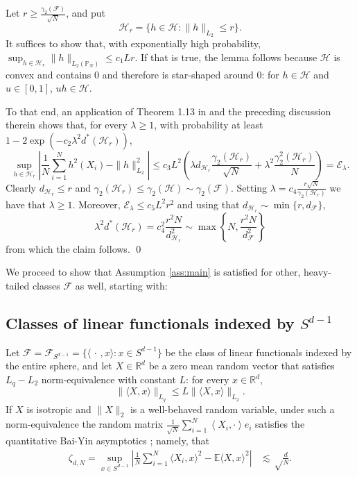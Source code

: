 \documentclass[11pt]{amsart}
\newcommand{\R}{\mathbb{R}}
\newcommand{\inr}[1]{\left\langle #1 \right\rangle}
\theoremstyle{definition}
\newcommand{\E}{\mathbb{E}}
\renewcommand{\P}{\mathbb{P}}
\numberwithin{equation}{section}
\begin{document}
	Let $r\geq   \frac{ \gamma_2(\mathcal{F}) }{ \sqrt N}$, and put 
	\[\mathcal{H}_r = \{ h\in \mathcal{H} : \|h\|_{L_{2}}\leq r\}.\]	
	It suffices to show that, with exponentially high probability, $\sup_{h\in\mathcal{H}_r} \|h\|_{L_2(\P_N)} \leq c_1L r$.
	If that is true, the lemma follows because $\mathcal{H}$ is convex and contains 0 and therefore is star-shaped around 0: for $h\in\mathcal{H}$ and $u\in[0,1]$, $uh\in\mathcal{H}$.
	
	To that end, an application of Theorem 1.13 in \cite{mendelson2016upper} and the preceding discussion therein shows that, for every $\lambda\geq 1$, with probability at least $1-2\exp(- c_2\lambda^2 d^{\ast}( \mathcal{H}_r))$,
	\[ \sup_{h\in \mathcal{H}_r} \left| \frac{1}{N}\sum_{i=1}^{N} h^{2}(X_{i}) - \|h\|_{L_{2}}^{2} \right|
	\leq c_{3} L^{2}  \left(
	 \lambda d_{\mathcal{H}_r} \frac{ \gamma_{2}(\mathcal{H}_r) }{\sqrt N} +  \lambda^2 \frac{ \gamma_{2}^{2}(\mathcal{H}_r) }{ N}
	\right)
	=\mathcal{E}_\lambda.\]
	Clearly $d_{\mathcal{H}_r}\leq  r $ and  $\gamma_{2}(\mathcal{H}_r) \leq  \gamma_{2}(\mathcal{H})\sim\gamma_2(\mathcal{F})$.
	Setting $\lambda = c_4\frac{r \sqrt N }{\gamma_2(\mathcal{H}_r)}$ we have that $\lambda\geq 1$.
	Moreover, $\mathcal{E}_\lambda\leq c_{5}L^{2 }r^{2}$ and using that $d_{\mathcal{H}_r} \sim \min\{r, d_{\mathcal{F}} \}$,
	\[ \lambda^2 d^{\ast}( \mathcal{H}_r) 
	=   c_4^2  \frac{r^2 N }{ d_{\mathcal{H}_r}^2} 
	\sim \max\left\{ N, \frac{r^2 N }{ d_{\mathcal{F}}^2} \right\}  
 \] 
	from which the claim follows.
\qed

We proceed to show that Assumption \ref{ass:main} is satisfied for other, heavy-tailed classes $\mathcal{F}$ as well, starting with:



\subsection{Classes of linear functionals indexed by $S^{d-1}$} 


Let $\mathcal{F}=\mathcal{F}_{S^{d-1}} =  \{ \langle \,\cdot \,, x\rangle : x\in S^{d-1}\}$ be  the class of linear functionals indexed by the entire sphere, and let  $X\in\R^{d}$ be a zero mean random vector that satisfies $L_{q}-L_{2}$ norm-equivalence with constant $L$: for every $x\in \R^{d}$,
\[  \| \langle X, x\rangle \|_{L_{q}}
\leq L  \| \langle X, x\rangle \|_{L_{2}} . \]
If $X$ is isotropic and  $\|X\|_{2}$ is a well-behaved random variable, under such a norm-equivalence the random matrix $\frac{1}{\sqrt N} \sum_{i=1}^{N}\inr{X_{i},\cdot}e _{i}$ satisfies the quantitative Bai-Yin asymptotics \cite{bai1993limit}; namely, that
\begin{align*}
\zeta_{d,N}=\sup_{x\in S^{d-1}} \left| \frac{1}{N}\sum_{i=1}^{N} \langle X_{i},x\rangle^{2} - \E \langle X,x\rangle^{2} \right|
&\lesssim \sqrt\frac{d}{N}.
\end{align*}
\end{document}
